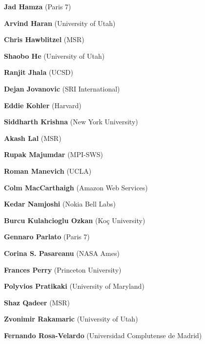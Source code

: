 \documentclass{article}
\begin{document}
\begin{commalist}
    \item {\bf Jad Hamza} (Paris 7)


    \item {\bf Arvind Haran} (University of Utah)


    \item {\bf Chris Hawblitzel} (MSR)


    \item {\bf Shaobo He} (University of Utah)


    \item {\bf Ranjit Jhala} (UCSD)


    \item {\bf Dejan Jovanovic} (SRI International)


    \item {\bf Eddie Kohler} (Harvard)


    \item {\bf Siddharth Krishna} (New York University)


    \item {\bf Akash Lal} (MSR)


    \item {\bf Rupak Majumdar} (MPI-SWS)


    \item {\bf Roman Manevich} (UCLA)


    \item {\bf Colm MacCarthaigh} (Amazon Web Services)


    \item {\bf Kedar Namjoshi} (Nokia Bell Labs)


    \item {\bf Burcu Kulahcioglu Ozkan} (Koç University)


    \item {\bf Gennaro Parlato} (Paris 7)


    \item {\bf Corina S. Pasareanu} (NASA Ames)


    \item {\bf Frances Perry} (Princeton University)


    \item {\bf Polyvios Pratikaki} (University of Maryland)


    \item {\bf Shaz Qadeer} (MSR)


    \item {\bf Zvonimir Rakamaric} (University of Utah)


    \item {\bf Fernando Rosa-Velardo} (Universidad Complutense de Madrid)



\end{commalist}
\end{document}
